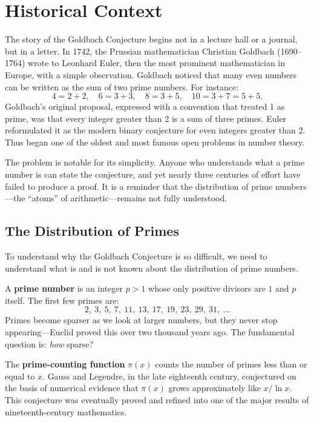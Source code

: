 \section{Historical Context}

The story of the Goldbach Conjecture begins not in a lecture hall or a journal, but in a letter. In 1742, the Prussian mathematician Christian Goldbach (1690--1764) wrote to Leonhard Euler, then the most prominent mathematician in Europe, with a simple observation. Goldbach noticed that many even numbers can be written as the sum of two prime numbers. For instance:
\[
    4 = 2 + 2, \quad 6 = 3 + 3, \quad 8 = 3 + 5, \quad 10 = 3 + 7 = 5 + 5.
\]
Goldbach's original proposal, expressed with a convention that treated 1 as prime, was that every integer greater than 2 is a sum of three primes. Euler reformulated it as the modern binary conjecture for even integers greater than 2. Thus began one of the oldest and most famous open problems in number theory.

The problem is notable for its simplicity. Anyone who understands what a prime number is can state the conjecture, and yet nearly three centuries of effort have failed to produce a proof. It is a reminder that the distribution of prime numbers---the ``atoms'' of arithmetic---remains not fully understood.

\subsection{The Distribution of Primes}

To understand why the Goldbach Conjecture is so difficult, we need to understand what is and is not known about the distribution of prime numbers.

A \textbf{prime number} is an integer $p > 1$ whose only positive divisors are $1$ and $p$ itself. The first few primes are:
\[
    2,\ 3,\ 5,\ 7,\ 11,\ 13,\ 17,\ 19,\ 23,\ 29,\ 31,\ \ldots
\]
Primes become sparser as we look at larger numbers, but they never stop appearing---Euclid proved this over two thousand years ago. The fundamental question is: \emph{how} sparse?

The \textbf{prime-counting function} $\pi(x)$ counts the number of primes less than or equal to $x$. Gauss and Legendre, in the late eighteenth century, conjectured on the basis of numerical evidence that $\pi(x)$ grows approximately like $x / \ln x$. This conjecture was eventually proved and refined into one of the major results of nineteenth-century mathematics.

